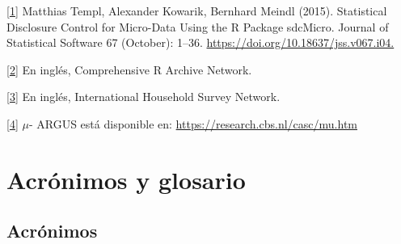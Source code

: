 \documentclass[]{book}
\theoremstyle{definition}
\theoremstyle{definition}
\theoremstyle{definition}
\theoremstyle{definition}
\theoremstyle{remark}
\begin{document}
\protect\hyperlink{_ftnref1}{{[}1{]}} Matthias Templ, Alexander Kowarik, Bernhard Meindl (2015). Statistical Disclosure Control for Micro-Data Using the R Package sdcMicro. Journal of Statistical Software 67 (October): 1--36. \url{https://doi.org/10.18637/jss.v067.i04.}

\protect\hyperlink{_ftnref2}{{[}2{]}} En inglés, Comprehensive R Archive Network.

\protect\hyperlink{_ftnref3}{{[}3{]}} En inglés, International Household Survey Network.

\protect\hyperlink{_ftnref4}{{[}4{]}} \(\mu\)- ARGUS está disponible en: \url{https://research.cbs.nl/casc/mu.htm}

\hypertarget{acruxf3nimos-y-glosario}{%
\chapter{Acrónimos y glosario}\label{acruxf3nimos-y-glosario}}

\hypertarget{acruxf3nimos}{%
\section{Acrónimos}\label{acruxf3nimos}}
\end{document}

